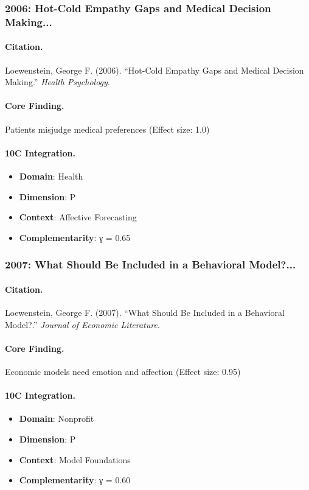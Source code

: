 \subsubsection{2006: Hot-Cold Empathy Gaps and Medical Decision Making...}

\paragraph{Citation.}
Loewenstein, George F. (2006). ``Hot-Cold Empathy Gaps and Medical Decision Making.''
\textit{Health Psychology}.

\paragraph{Core Finding.}
Patients misjudge medical preferences (Effect size: 1.0)

\paragraph{10C Integration.}
\begin{itemize}[nosep]
  \item \textbf{Domain}: Health
  \item \textbf{Dimension}: P
  \item \textbf{Context}: Affective Forecasting
  \item \textbf{Complementarity}: γ = 0.65
\end{itemize}

\subsubsection{2007: What Should Be Included in a Behavioral Model?...}

\paragraph{Citation.}
Loewenstein, George F. (2007). ``What Should Be Included in a Behavioral Model?.''
\textit{Journal of Economic Literature}.

\paragraph{Core Finding.}
Economic models need emotion and affection (Effect size: 0.95)

\paragraph{10C Integration.}
\begin{itemize}[nosep]
  \item \textbf{Domain}: Nonprofit
  \item \textbf{Dimension}: P
  \item \textbf{Context}: Model Foundations
  \item \textbf{Complementarity}: γ = 0.60
\end{itemize}

